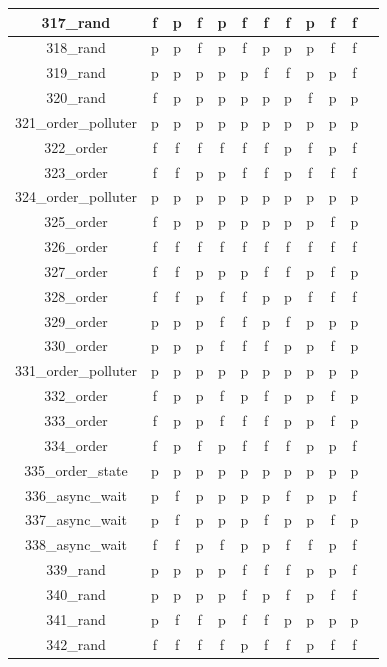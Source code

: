 \documentclass[
fancyheadings, %
%
%
]{stsreprt}
\begin{document}
\begin{longtable}{|c|c|c|c|c|c|c|c|c|c|c|c|}
\hline
317\_rand & f & p & f & p & f & f & f & p & f & f \\
\hline
318\_rand & p & p & f & p & f & p & p & p & f & f \\
\hline
319\_rand & p & p & p & p & p & f & f & p & p & f \\
\hline
320\_rand & f & p & p & p & p & p & p & f & p & p \\
\hline
321\_order\_polluter & p & p & p & p & p & p & p & p & p & p \\
\hline
322\_order & f & f & f & f & f & f & p & f & p & f \\
\hline
323\_order & f & f & p & p & f & f & p & f & f & f \\
\hline
324\_order\_polluter & p & p & p & p & p & p & p & p & p & p \\
\hline
325\_order & f & p & p & p & p & p & p & p & f & p \\
\hline
326\_order  & f & f & f & f & f & f & f & f & f & f \\
\hline
327\_order & f & f & p & p & p & f & f & p & f & p \\
\hline
328\_order & f & f & p & f & f & p & p & f & f & f \\
\hline
329\_order & p & p & p & f & f & p & f & p & p & p \\
\hline
330\_order & p & p & p & f & f & f & p & p & f & p \\
\hline
331\_order\_polluter & p & p & p & p & p & p & p & p & p & p \\
\hline
332\_order & f & p & p & f & p & f & p & p & f & p \\
\hline
333\_order & f & p & p & f & f & f & p & p & f & p \\
\hline
334\_order & f & p & f & p & f & f & f & p & p & f \\
\hline
335\_order\_state & p & p & p & p & p & p & p & p & p & p \\
\hline
336\_async\_wait & p & f & p & p & p & p & f & p & p & f \\
\hline
337\_async\_wait & p & f & p & p & p & f & p & p & f & p \\
\hline
338\_async\_wait & f & f & p & f & p & p & f & f & p & f \\
\hline
339\_rand & p & p & p & p & f & f & f & p & p & f \\
\hline
340\_rand & p & p & p & p & f & p & f & p & f & f \\
\hline
341\_rand & p & f & f & p & f & f & p & p & p & p \\
\hline
342\_rand & f & f & f & f & p & f & f & p & f & f \\

\end{longtable}
\end{document}
